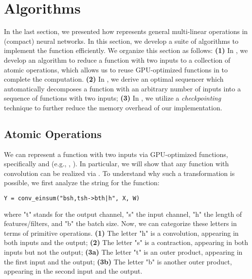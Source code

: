 \section{Algorithms}
\label{sec:algorithms}

In the last section, we presented how \conveinsum represents general multi-linear operations in (compact) neural networks.
In this section, we develop a suite of algorithms to implement the \conveinsum function efficiently. We organize this section as follows: 
\textbf{(1)} In , we develop an algorithm to reduce a \conveinsum function with two inputs to a collection  of atomic \pytorch operations, which allows us to reuse GPU-optimized functions in \pytorch to complete the computation. 
\textbf{(2)} In , we derive an optimal sequencer which automatically decomposes a \conveinsum function with an arbitrary number of inputs into a sequence of \conveinsum functions with two inputs;
\textbf{(3)} In , we utilize a {\em checkpointing} technique to further reduce the memory overhead of our implementation.

\subsection{Atomic Operations}
\label{sub:algorithms-atomic}

We can represent a \conveinsum function with two inputs via GPU-optimized \pytorch functions, specifically \einsum and \convNd (e.g., \convOne, \convTwo).
In particular, we will show that any \conveinsum function with convolution can be realized via \convNd. To understand why such a transformation is possible, we first analyze the \conveinsum string for the \convOne function:
\begin{lstlisting}
Y = conv_einsum("bsh,tsh->bth|h", X, W)
\end{lstlisting}
\vspace{-1em}
where \textsf{"t"} stands for the output channel, \textsf{"s"} the input channel, \textsf{"h"} the length of features/filters, and \textsf{"b"} the batch size. Now, we can categorize these letters in terms of primitive operations.
\textbf{(1)} The letter \textsf{"h"} is a convolution, 
appearing in both inputs and the output;
\textbf{(2)} The letter \textsf{"s"} is a contraction, 
appearing in both inputs but not the output;
\textbf{(3a)} The letter \textsf{"t"} is an outer product,
appearing in the first input and the output;
\textbf{(3b)} The letter \textsf{"b"} is another outer product,
appearing in the second input and the output.

